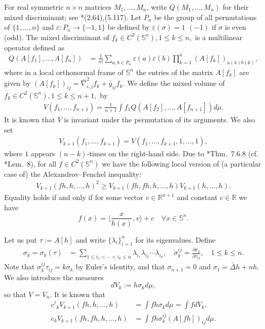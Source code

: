 \documentclass[12pt]{amsart}
\theoremstyle{definition}
\numberwithin{equation}{section}
\newcommand{\Sn}{\mathbb{S}^n}
\theoremstyle{remark}
\numberwithin{equation}{section}
\begin{document}
For real symmetric $n\times n$ matrices $M_1,\ldots,M_{n}$, write $Q(M_1,\ldots,M_{n})$ for their mixed discriminant; see \cite{Sch14}*{(2.64),(5.117)}. Let $P_{n}$ be the group of all permutations of $\{1,\ldots,n\}$ and $\varepsilon:P_{n}\to \{-1,1\}$ be defined by $\varepsilon(\sigma)=1$ $(-1)$ if $\sigma$ is even (odd). The mixed discriminant of $f_k\in C^{2}(\Sn), 1\leq k\leq n,$ is a multilinear operator defined as
\begin{align*}
Q\left(A[f_1],\ldots, A[f_{n}]\right)
&=\frac{1}{n!}\sum_{a,b\in P_{n}}\varepsilon(a)\varepsilon(b)\prod_{k=1}^{n}(A[f_k])_{a(k)b(k)},
\end{align*}
where in a local orthonormal frame of $\Sn$ the entries of the matrix $A[f_k]$ are given by $(A[f_k])_{ij}=\bar{\nabla}^2_{i,j}f_k+\bar{g}_{ij}f_k$. We define the mixed volume of $f_k\in C^{2}(\Sn), 1\leq k\leq n+1,$ by
\begin{align*}
V(f_1,\ldots,f_{n+1})=\frac{1}{n+1}\int f_1Q\left(A[f_2],\ldots, A[f_{n+1}]\right)d\mu.
\end{align*}
It is known that $V$ is invariant under the permutation of its arguments. 
We also set
\begin{align*}
V_{k+1}(f_1,\ldots,f_{k+1})=V(f_1,\ldots,f_{k+1},1,\ldots,1),
\end{align*}
where $1$ appears $(n-k)$-times on the right-hand side.  
Due to \cite{Sch14}*{Thm.~7.6.8} (cf. \cite{An97}*{Lem.~8}), for all $f\in C^2(\Sn)$ we have the following local version of (a particular case of) the Alexandrov--Fenchel inequality:
\begin{align} \label{A-F}
V_{k+1}(fh,h,\ldots,h)^2\geq V_{k+1}(fh,fh,h,\ldots,h)V_{k+1}(h,\ldots,h).
\end{align}
Equality holds if and only if for some vector $v \in \mathbb{R}^{n+1}$ and constant $c \in \mathbb{R}$ we have
\[f(x)=\langle \frac{x}{h(x)},v\rangle +c\quad \forall x\in \Sn.\]

Let us put $\tau:=A[h]$ and write $\{\lambda_i\}_{i=1}^n$ for its eigenvalues. Define
\begin{align*}
\sigma_k=\sigma_k(\tau)&=\sum_{1\leq i_1<\cdots<i_k\leq n}\lambda_{i_1}\lambda_{i_2}\cdots\lambda_{i_k},\quad \sigma_k^{ij}=\frac{\partial \sigma_k}{\partial \tau_{ij}},\quad 1\leq k\leq n.
\end{align*}
Note that $\sigma_k^{ij}\tau_{ij}=k\sigma_k$ by Euler's identity, and that $\sigma_{n+1}=0$ and $\sigma_1=\bar{\Delta}h+nh$. We also introduce the measures
\[
dV_k := h \sigma_k d\mu ,
\]
so that $V = V_n$. It is known that
\begin{align*}
c'_{k} V_{k+1}(fh,h,\ldots,h) &= \int f h \sigma_k d\mu = \int f dV_k ,\\
c_{k} V_{k+1}(fh,fh,h,\ldots,h) &= \int f h \sigma_k^{ij}(A[fh])_{ij} d\mu . 
\end{align*}
\end{document}
